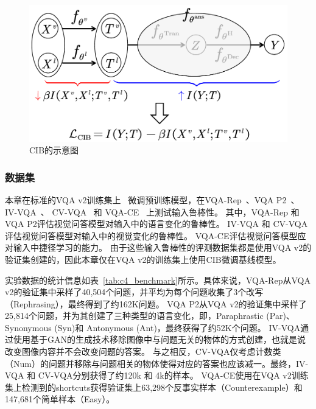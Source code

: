 \begin{figure}[!t]
\centering
\includegraphics[width=0.5\linewidth]{figure/c4_cib.pdf}
\caption{CIB的示意图}
\label{fig:c4_cib_overall}
\end{figure}







\subsubsection{数据集}
本章在标准的VQA v2训练集上~\cite{goyal2017making} 微调预训练模型，在VQA-Rep~\cite{shah2019cycle}、VQA P2~\cite{whitehead2020learning}、 IV-VQA~\cite{agarwal2020towards}、 CV-VQA~\cite{agarwal2020towards} 和 VQA-CE~\cite{dancette2021beyond} 上测试输入鲁棒性。
其中，VQA-Rep 和 VQA P2评估视觉问答模型对输入中的语言变化的鲁棒性。
IV-VQA 和 CV-VQA评估视觉问答模型对输入中的视觉变化的鲁棒性。
VQA-CE评估视觉问答模型应对输入中捷径学习的能力。
由于这些输入鲁棒性的评测数据集都是使用VQA v2的验证集创建的，因此本章仅在VQA v2的训练集上使用CIB微调基线模型。

实验数据的统计信息如表~\ref{tab:c4_benchmark}所示。具体来说，VQA-Rep从VQA v2的验证集中采样了40,504个问题，并平均为每个问题收集了3个改写（Rephrasing），最终得到了约162K问题。
VQA P2从VQA v2的验证集中采样了25,814个问题，并为其创建了三种类型的语言变化，即，Paraphrastic (Par)、 Synonymous (Syn)和 Antonymous (Ant)，最终获得了约52K个问题。
IV-VQA通过使用基于GAN的生成技术移除图像中与问题无关的物体的方式创建，也就是说改变图像内容并不会改变问题的答案。
与之相反，CV-VQA仅考虑计数类（Num）的问题并移除与问题相关的物体使得对应的答案也应该减一。最终，IV-VQA 和 CV-VQA分别获得了约120k 和 4k的样本。
VQA-CE使用在VQA v2训练集上检测到的shortcuts获得验证集上63,298个反事实样本（Counterexample）和147,681个简单样本（Easy）。


